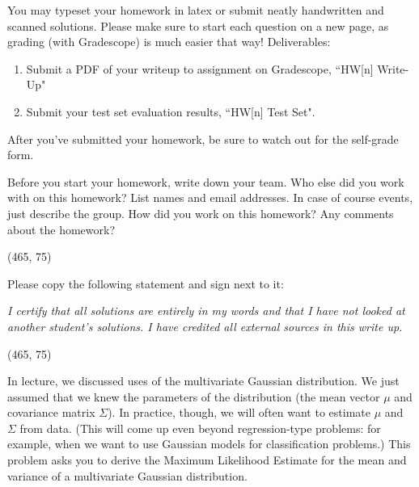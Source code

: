 
You may typeset your homework in latex or submit neatly handwritten and scanned solutions. Please make sure to start each question on a new page, as grading (with Gradescope) is much easier that way! Deliverables:

\begin{enumerate}
  \item Submit a PDF of your writeup to assignment on Gradescope, ``HW[n] Write-Up"
  \item Submit your test set evaluation results, ``HW[n] Test Set".
\end{enumerate}

After you've submitted your homework, be sure to watch out for the self-grade form.

\begin{Parts}

\Part Before you start your homework, write down your team. Who else did you work with on this homework? List names and email addresses. In case of course events, just describe the group. How did you work on this homework? Any comments about the homework?

\vspace{15pt}
\framebox(465, 75){}

\Part Please copy the following statement and sign next to it:

\textit{I certify that all solutions are entirely in my words and that I have not looked at another student's solutions. I have credited all external sources in this write up.}

\vspace{15pt}
\framebox(465, 75){}

\end{Parts}

\pagebreak
{}

In lecture, we discussed uses of the multivariate Gaussian
distribution. We just assumed that we knew the parameters of the
distribution (the mean vector $\mu$ and covariance matrix
$\Sigma$). In practice, though, we will often want to estimate $\mu$
and $\Sigma$ from data. (This will come up even beyond regression-type
problems: for example, when we want to use Gaussian models for
classification problems.) This problem asks you to derive the Maximum
Likelihood Estimate for the mean and variance of a multivariate
Gaussian distribution. 

